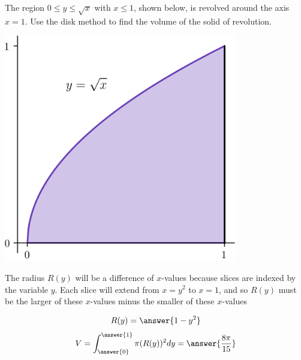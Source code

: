 \documentclass{ximera}
\begin{document}
\begin{problem}
The region $0 \leq y \leq \sqrt{x}$ with $x \leq 1$, shown below, is revolved around the axis $x=1$. Use the disk method to find the volume of the solid of revolution.
\begin{center}
\begin{image}
\includegraphics[width=4in]{diskwasher/disk02.png}
\end{image}
\end{center}
\begin{hint}
The radius $R(y)$ will be a difference of $x$-values because slices are indexed by the variable $y$.
Each slice will extend from $x = y^2$ to $x = 1$, and so $R(y)$ must be the larger of these $x$-values minus the smaller of these $x$-values
\end{hint}
\begin{prompt}
\[ R(y) = \answer{1 - y^2} \]
\[ V = \int_{\answer{0}}^{\answer{1}} \pi (R(y))^2 dy = \answer{\frac{8\pi}{15}} \]
\end{prompt}
\end{problem}
\end{document}
